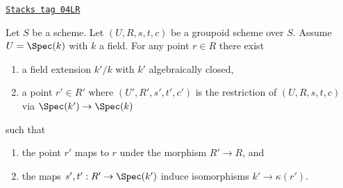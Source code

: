 \begin{lemma}
\label{more-groupoids-lemma-groupoid-on-field-explain-points}
\href{https://stacks.math.columbia.edu/tag/04LR}{\texttt{Stacks tag 04LR}}

Let $S$ be a scheme. Let $(U, R, s, t, c)$ be a groupoid scheme
over $S$. Assume $U = \Spec(k)$ with $k$ a field.
For any point $r \in R$ there exist
\begin{enumerate}
\item a field extension $k'/k$ with $k'$ algebraically closed,
\item a point $r' \in R'$ where $(U', R', s', t', c')$ is the
restriction of $(U, R, s, t, c)$ via $\Spec(k') \to \Spec(k)$
\end{enumerate}
such that
\begin{enumerate}
\item the point $r'$ maps to $r$ under the morphism $R' \to R$, and
\item the maps $s', t' : R' \to \Spec(k')$ induce isomorphisms
$k' \to \kappa(r')$.
\end{enumerate}
\end{lemma}

